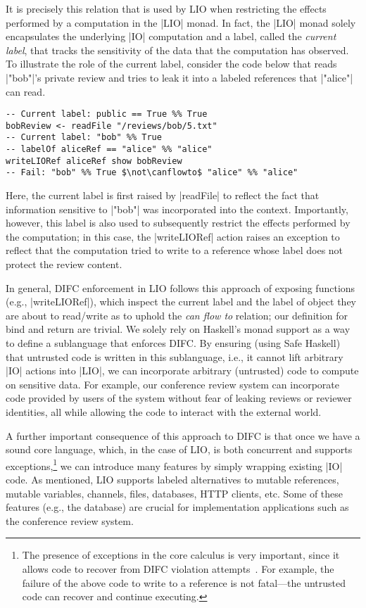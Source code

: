 It is precisely this relation that is used by LIO when restricting the
effects performed by a computation in the \hs|LIO| monad.
%
In fact, the \hs|LIO| monad solely encapsulates the underlying
\hs|IO| computation and a label, called the \emph{current label}, that
tracks the sensitivity of the data that the computation has observed.
%
To illustrate the role of the current label, consider the code below
that reads \hs|"bob"|'s private review and tries to leak it into a
labeled references that \hs|"alice"| can read.
\begin{verbatim}
-- Current label: public == True %% True
bobReview <- readFile "/reviews/bob/5.txt"
-- Current label: "bob" %% True
-- labelOf aliceRef == "alice" %% "alice"
writeLIORef aliceRef show bobReview
-- Fail: "bob" %% True $\not\canflowto$ "alice" %% "alice"
\end{verbatim}
%
Here, the current label is first raised by \hs|readFile| to reflect
the fact that information sensitive to \hs|"bob"| was incorporated
into the context.
%
Importantly, however, this label is also used to subsequently restrict
the effects performed by the computation; in this case, the
\hs|writeLIORef| action raises an exception to reflect that
the computation tried to write to a reference whose label
does not protect the review content.

In general, DIFC enforcement in LIO follows this approach of exposing
functions (e.g., \hs|writeLIORef|), which inspect the current label
and the label of object they are about to read/write as to uphold the
\emph{can flow to} relation; our definition for bind and return are trivial.
%
We solely rely on Haskell's monad support as a way to define a
sublanguage that enforces DIFC.
%
By ensuring (using Safe Haskell) that untrusted code is written in
this sublanguage, i.e., it cannot lift arbitrary \hs|IO| actions into
\hs|LIO|, we can incorporate arbitrary (untrusted) code to compute on
sensitive data.
%
For example, our conference review system can incorporate code
provided by users of the system without fear of leaking reviews or
reviewer identities, all while allowing the code to interact with the
external world.

A further important consequence of this approach to DIFC is that once
we have a sound core language, which, in the case of LIO, is both
concurrent and supports exceptions,\footnote{
  The presence of exceptions in the core calculus is very important,
  since it allows code to recover from DIFC violation
  attempts~\cite{Breeze, stefan:2012:arxiv-flexible}.
  For example, the failure of the above code to write to a reference
  is not fatal---the untrusted code can recover and continue
  executing.
  
}
we can introduce many features by simply wrapping existing \hs|IO|
code.
%
As mentioned, LIO supports labeled alternatives to mutable references,
mutable variables, channels, files, databases, HTTP clients, etc.
%
Some of these features (e.g., the database) are crucial for
implementation applications such as the conference review system.

